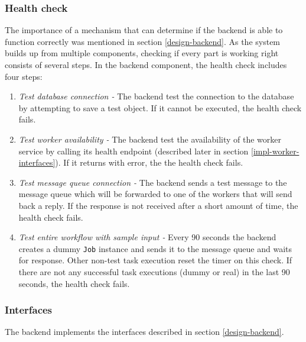 \subsubsection{Health check} \label{impl-backend-healthcheck}

The importance of a mechanism that can determine if the backend is able to function correctly was mentioned in section \ref{design-backend}. As the system builds up from multiple components, checking if every part is working right consists of several steps. In the backend component, the health check includes four steps:

\begin{enumerate}
	\item \emph{Test database connection - }The backend test the connection to the database by attempting to save a test object. If it cannot be executed, the health check fails.
	\item \emph{Test worker availability - }The backend test the availability of the worker service by calling its health endpoint (described later in section \ref{impl-worker-interfaces}). If it returns with error, the the health check fails.
	\item \emph{Test message queue connection - }The backend sends a test message to the message queue which will be forwarded to one of the workers that will send back a reply. If the response is not received after a short amount of time, the health check fails.
	\item \emph{Test entire workflow with sample input - }Every 90 seconds the backend creates a dummy \texttt{Job} instance and sends it to the message queue and waits for response. Other non-test task execution reset the timer on this check. If there are not any successful task executions (dummy or real) in the last 90 seconds, the health check fails.
\end{enumerate}

\subsubsection{Interfaces} \label{impl-backend-interfaces}

The backend implements the interfaces described in section \ref{design-backend}.

